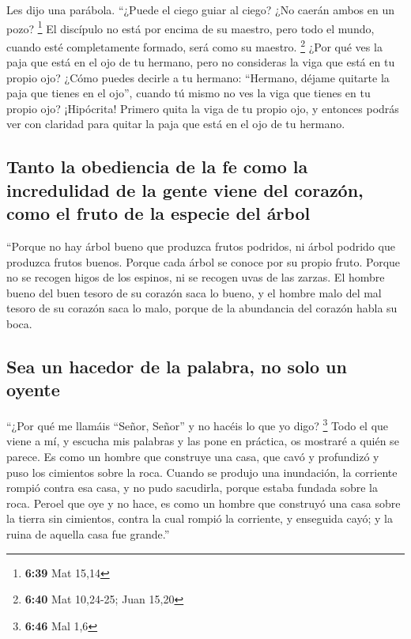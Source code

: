  Les dijo una parábola. ``¿Puede el ciego guiar al ciego?
¿No caerán ambos en un pozo? \footnote{\textbf{6:39} Mat 15,14}
 El discípulo no está por encima de su maestro, pero todo
el mundo, cuando esté completamente formado, será como su maestro.
\footnote{\textbf{6:40} Mat 10,24-25; Juan 15,20}  ¿Por
qué ves la paja que está en el ojo de tu hermano, pero no consideras la
viga que está en tu propio ojo?  ¿Cómo puedes decirle a
tu hermano: ``Hermano, déjame quitarte la paja que tienes en el ojo'',
cuando tú mismo no ves la viga que tienes en tu propio ojo? ¡Hipócrita!
Primero quita la viga de tu propio ojo, y entonces podrás ver con
claridad para quitar la paja que está en el ojo de tu hermano.

\hypertarget{tanto-la-obediencia-de-la-fe-como-la-incredulidad-de-la-gente-viene-del-corazuxf3n-como-el-fruto-de-la-especie-del-uxe1rbol}{%
\subsection{Tanto la obediencia de la fe como la incredulidad de la
gente viene del corazón, como el fruto de la especie del
árbol}\label{tanto-la-obediencia-de-la-fe-como-la-incredulidad-de-la-gente-viene-del-corazuxf3n-como-el-fruto-de-la-especie-del-uxe1rbol}}

 ``Porque no hay árbol bueno que produzca frutos
podridos, ni árbol podrido que produzca frutos buenos. 
Porque cada árbol se conoce por su propio fruto. Porque no se recogen
higos de los espinos, ni se recogen uvas de las zarzas. 
El hombre bueno del buen tesoro de su corazón saca lo bueno, y el hombre
malo del mal tesoro de su corazón saca lo malo, porque de la abundancia
del corazón habla su boca.

\hypertarget{sea-un-hacedor-de-la-palabra-no-solo-un-oyente}{%
\subsection{Sea un hacedor de la palabra, no solo un
oyente}\label{sea-un-hacedor-de-la-palabra-no-solo-un-oyente}}

 ``¿Por qué me llamáis ``Señor, Señor'' y no hacéis lo
que yo digo? \footnote{\textbf{6:46} Mal 1,6}  Todo el
que viene a mí, y escucha mis palabras y las pone en práctica, os
mostraré a quién se parece.  Es como un hombre que
construye una casa, que cavó y profundizó y puso los cimientos sobre la
roca. Cuando se produjo una inundación, la corriente rompió contra esa
casa, y no pudo sacudirla, porque estaba fundada sobre la roca.
 Peroel que oye y no hace, es como un hombre que
construyó una casa sobre la tierra sin cimientos, contra la cual rompió
la corriente, y enseguida cayó; y la ruina de aquella casa fue grande.''

